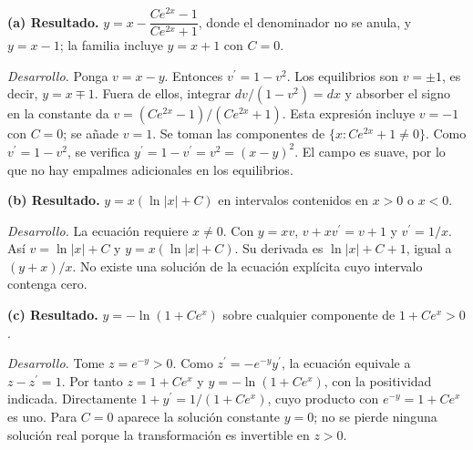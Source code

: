 \noindent\textbf{(a) Resultado.} $y=x-\dfrac{Ce^{2x}-1}{Ce^{2x}+1}$, donde el denominador no se anula, y $y=x-1$; la familia incluye $y=x+1$ con $C=0$.

\noindent\textit{Desarrollo.} Ponga $v=x-y$. Entonces $v^{\prime}=1-v^2$. Los equilibrios son $v=\pm1$, es decir, $y=x\mp1$. Fuera de ellos, integrar $dv/(1-v^2)=dx$ y absorber el signo en la constante da $v=(Ce^{2x}-1)/(Ce^{2x}+1)$. Esta expresión incluye $v=-1$ con $C=0$; se añade $v=1$. Se toman las componentes de $\{x:Ce^{2x}+1\ne0\}$. Como $v^{\prime}=1-v^2$, se verifica $y^{\prime}=1-v^{\prime}=v^2=(x-y)^2$. El campo es suave, por lo que no hay empalmes adicionales en los equilibrios.

\medskip

\noindent\textbf{(b) Resultado.} $y=x(\ln|x|+C)$ en intervalos contenidos en $x>0$ o $x<0$.

\noindent\textit{Desarrollo.} La ecuación requiere $x\ne0$. Con $y=xv$, $v+xv^{\prime}=v+1$ y $v^{\prime}=1/x$. Así $v=\ln|x|+C$ y $y=x(\ln|x|+C)$. Su derivada es $\ln|x|+C+1$, igual a $(y+x)/x$. No existe una solución de la ecuación explícita cuyo intervalo contenga cero.

\medskip

\noindent\textbf{(c) Resultado.} $y=-\ln(1+Ce^x)$ sobre cualquier componente de $1+Ce^x>0$.

\noindent\textit{Desarrollo.} Tome $z=e^{-y}>0$. Como $z^{\prime}=-e^{-y}y^{\prime}$, la ecuación equivale a $z-z^{\prime}=1$. Por tanto $z=1+Ce^x$ y $y=-\ln(1+Ce^x)$, con la positividad indicada. Directamente $1+y^{\prime}=1/(1+Ce^x)$, cuyo producto con $e^{-y}=1+Ce^x$ es uno. Para $C=0$ aparece la solución constante $y=0$; no se pierde ninguna solución real porque la transformación es invertible en $z>0$.
